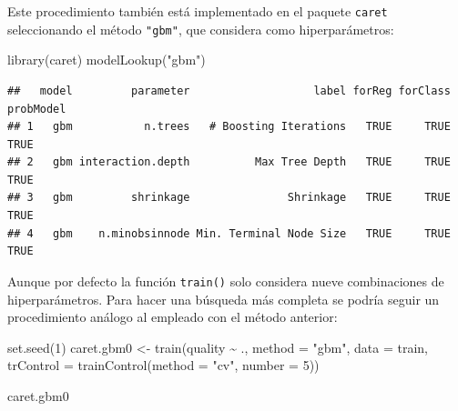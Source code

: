 \documentclass[
  spanish,
]{book}
\newenvironment{Shaded}{\begin{snugshade}}{\end{snugshade}}
\newcommand{\AttributeTok}[1]{\textcolor[rgb]{0.77,0.63,0.00}{#1}}
\newcommand{\DecValTok}[1]{\textcolor[rgb]{0.00,0.00,0.81}{#1}}
\newcommand{\FunctionTok}[1]{\textcolor[rgb]{0.00,0.00,0.00}{#1}}
\newcommand{\NormalTok}[1]{#1}
\newcommand{\OtherTok}[1]{\textcolor[rgb]{0.56,0.35,0.01}{#1}}
\newcommand{\SpecialCharTok}[1]{\textcolor[rgb]{0.00,0.00,0.00}{#1}}
\newcommand{\StringTok}[1]{\textcolor[rgb]{0.31,0.60,0.02}{#1}}
\theoremstyle{break}
\theoremstyle{definition}
\theoremstyle{definition}
\theoremstyle{definition}
\theoremstyle{definition}
\theoremstyle{remark}
\begin{document}
Este procedimiento también está implementado en el paquete \texttt{caret} seleccionando el método \texttt{"gbm"}, que considera como hiperparámetros:

\begin{Shaded}
\begin{Highlighting}[]
\FunctionTok{library}\NormalTok{(caret)}
\FunctionTok{modelLookup}\NormalTok{(}\StringTok{"gbm"}\NormalTok{)}
\end{Highlighting}
\end{Shaded}

\begin{verbatim}
##   model         parameter                   label forReg forClass probModel
## 1   gbm           n.trees   # Boosting Iterations   TRUE     TRUE      TRUE
## 2   gbm interaction.depth          Max Tree Depth   TRUE     TRUE      TRUE
## 3   gbm         shrinkage               Shrinkage   TRUE     TRUE      TRUE
## 4   gbm    n.minobsinnode Min. Terminal Node Size   TRUE     TRUE      TRUE
\end{verbatim}

Aunque por defecto la función \texttt{train()} solo considera nueve combinaciones de hiperparámetros. Para hacer una búsqueda más completa se podría seguir un procedimiento análogo al empleado con el método anterior:

\begin{Shaded}
\begin{Highlighting}[]
\FunctionTok{set.seed}\NormalTok{(}\DecValTok{1}\NormalTok{)}
\NormalTok{caret.gbm0 }\OtherTok{\textless{}{-}} \FunctionTok{train}\NormalTok{(quality }\SpecialCharTok{\textasciitilde{}}\NormalTok{ ., }\AttributeTok{method =} \StringTok{"gbm"}\NormalTok{, }\AttributeTok{data =}\NormalTok{ train,}
                   \AttributeTok{trControl =} \FunctionTok{trainControl}\NormalTok{(}\AttributeTok{method =} \StringTok{"cv"}\NormalTok{, }\AttributeTok{number =} \DecValTok{5}\NormalTok{))}
\end{Highlighting}
\end{Shaded}

\begin{Shaded}
\begin{Highlighting}[]
\NormalTok{caret.gbm0}
\end{Highlighting}
\end{Shaded}
\end{document}
